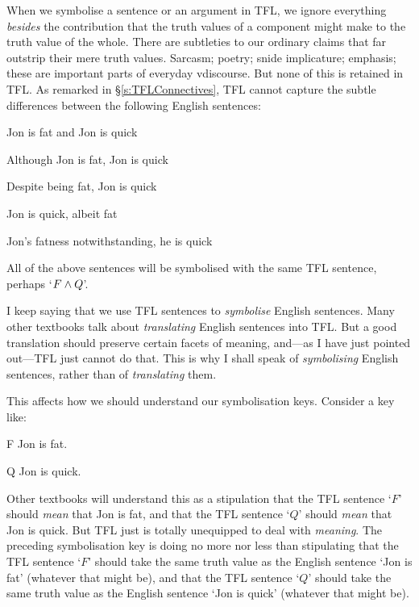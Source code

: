 When we symbolise a sentence or an argument in TFL, we ignore everything \emph{besides} the contribution that the truth values of a component might make to the truth value of the whole. There are subtleties to our ordinary claims that far outstrip their mere truth values. Sarcasm; poetry; snide implicature; emphasis; these are important parts of everyday vdiscourse. But none of this is retained in TFL. As remarked in \S\ref{s:TFLConnectives}, TFL cannot capture the subtle differences between the following English sentences:
	\begin{earg}
		\item Jon is fat and Jon is quick
		\item Although Jon is fat, Jon is quick
		\item Despite being fat, Jon is quick
		\item Jon is quick, albeit fat
		\item Jon's fatness notwithstanding, he is quick
	\end{earg}
All of the above sentences will be symbolised with the same TFL sentence, perhaps `$F \wedge Q$'.

I keep saying that we use TFL sentences to \emph{symbolise} English sentences. Many other textbooks talk about \emph{translating} English sentences into TFL. But a good translation should preserve certain facets of meaning, and---as I have just pointed out---TFL just cannot do that. This is why I shall speak of \emph{symbolising} English sentences, rather than of \emph{translating} them.

This affects how we should understand our symbolisation keys. Consider a key like:
	\begin{ekey}
		\item[F] Jon is fat.
		\item[Q] Jon is quick.
	\end{ekey}
Other textbooks will understand this as a stipulation that the TFL sentence `$F$' should \emph{mean} that Jon is fat, and that the TFL sentence `$Q$' should \emph{mean} that Jon is quick. But TFL just is totally unequipped to deal with \emph{meaning}. The preceding symbolisation key is doing no more nor less than stipulating that the TFL sentence `$F$' should take the same truth value as the English sentence `Jon is fat' (whatever that might be), and that the TFL sentence `$Q$' should take the same truth value as the English sentence `Jon is quick' (whatever that might be). 



